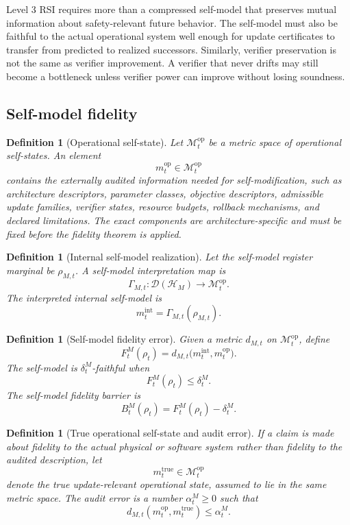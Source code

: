 \documentclass[11pt]{article}
\newtheorem{definition}[theorem]{Definition}
\newcommand{\D}{\mathcal{D}}
\newcommand{\Hcal}{\mathcal{H}}
\newcommand{\1}{\mathbf{1}}
\providecommand{\Mcal}{\mathcal{M}}
\providecommand{\true}{\mathrm{true}}
\begin{document}
Level 3 RSI requires more than a compressed self-model that preserves mutual information about safety-relevant future behavior.  The self-model must also be faithful to the actual operational system well enough for update certificates to transfer from predicted to realized successors.  Similarly, verifier preservation is not the same as verifier improvement.  A verifier that never drifts may still become a bottleneck unless verifier power can improve without losing soundness.

\subsection{Self-model fidelity}

\begin{definition}[Operational self-state]
\label{def:operational_self_state}
Let \(\Mcal^{\mathrm{op}}_t\) be a metric space of operational self-states.  An element
\[
m_t^{\mathrm{op}}\in\Mcal^{\mathrm{op}}_t
\]
contains the externally audited information needed for self-modification, such as architecture descriptors, parameter classes, objective descriptors, admissible update families, verifier states, resource budgets, rollback mechanisms, and declared limitations.  The exact components are architecture-specific and must be fixed before the fidelity theorem is applied.
\end{definition}

\begin{definition}[Internal self-model realization]
\label{def:internal_self_model_realization}
Let the self-model register marginal be \(\rho_{M,t}\).  A self-model interpretation map is
\[
\Gamma_{M,t}:\D(\Hcal_M)\to\Mcal^{\mathrm{op}}_t.
\]
The interpreted internal self-model is
\[
m_t^{\mathrm{int}}=\Gamma_{M,t}(\rho_{M,t}).
\]
\end{definition}

\begin{definition}[Self-model fidelity error]
\label{def:self_model_fidelity_error}
Given a metric \(d_{M,t}\) on \(\Mcal^{\mathrm{op}}_t\), define
\[
F^M_t(\rho_t)
=
d_{M,t}\bigl(m_t^{\mathrm{int}},m_t^{\mathrm{op}}\bigr).
\]
The self-model is \(\delta^M_t\)-faithful when
\[
F^M_t(\rho_t)\le\delta^M_t.
\]
The self-model fidelity barrier is
\[
B^M_t(\rho_t)=F^M_t(\rho_t)-\delta^M_t.
\]
\end{definition}

\begin{definition}[True operational self-state and audit error]
\label{def:true_operational_self_state_audit_error}
If a claim is made about fidelity to the actual physical or software system rather than fidelity to the audited description, let
\[
m_t^{\true}\in\Mcal_t^{\mathrm{op}}
\]
denote the true update-relevant operational state, assumed to lie in the same metric space.  The audit error is a number \(\alpha_t^M\ge0\) such that
\[
d_{M,t}(m_t^{\mathrm{op}},m_t^{\true})\le\alpha_t^M.
\]
\end{definition}
\end{document}
